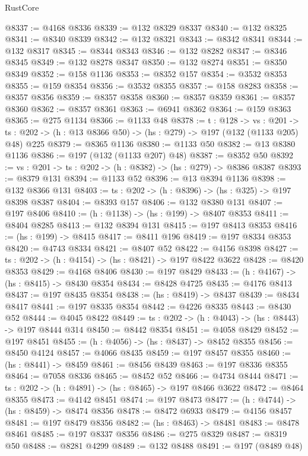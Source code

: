 \begin{lexlean}{RustCore}
\begin{coremodule}
@8337 := @4168 @8336
@8339 := @132 @8329 @8337
@8340 := @132 @8325
@8341 := @8340 @8339
@8342 := @132 @8321
@8343 := @8342 @8341
@8344 := @132 @8317
@8345 := @8344 @8343
@8346 := @132 @8282
@8347 := @8346 @8345
@8349 := @132 @8278 @8347
@8350 := @132 @8274
@8351 := @8350 @8349
@8352 := @158 @1136
@8353 := @8352 @157
@8354 := @3532 @8353
@8355 := @159 @8354
@8356 := @3532 @8355
@8357 := @158 @8283
@8358 := @8357 @8356
@8359 := @8357 @8358
@8360 := @8357 @8359
@8361 := @8357 @8360
@8362 := @8357 @8361
@8363 := @6941 @8362
@8364 := @159 @8363
@8365 := @275 @1134
@8366 := @1133 @48
@8378 := {t : @128} ->
  {vs : @201} ->
  {ts : @202} -> (h : @13 @8366 @50) -> (hs : @279) -> @197 (@132 (@1133 @205) @48) @225
@8379 := @8365 @1136
@8380 := @1133 @50
@8382 := @13 @8380 @1136
@8386 := @197 (@132 (@1133 @207) @48)
@8387 := @8352 @50
@8392 := {vs : @201} -> {ts : @202} -> (h : @8382) -> (hs : @279) -> @8386 @8387
@8393 := @8379 @131
@8394 := @1133 @52
@8396 := @13 @8394 @1136
@8398 := @132 @8366 @131
@8403 := {ts : @202} -> (h : @8396) -> (hs : @325) -> @197 @8398 @8387
@8404 := @8393 @157
@8406 := @132 @8380 @131
@8407 := @197 @8406
@8410 := (h : @1138) -> (hs : @199) -> @8407 @8353
@8411 := @8404 @8285
@8413 := @132 @8394 @131
@8415 := @197 @8413 @8353
@8416 := (hs : @199) -> @8415
@8417 := @8411 @196
@8419 := @197 @8334 @8353
@8420 := @4743 @8334
@8421 := @8407 @52
@8422 := @4156 @8398
@8427 := {ts : @202} -> (h : @4154) -> (hs : @8421) -> @197 @8422 @3622
@8428 := @8420 @8353
@8429 := @4168 @8406
@8430 := @197 @8429
@8433 := (h : @4167) -> (hs : @8415) -> @8430 @8354
@8434 := @8428 @4725
@8435 := @4176 @8413
@8437 := @197 @8435 @8354
@8438 := (hs : @8419) -> @8437
@8439 := @8434 @8417
@8441 := @197 @8335 @8354
@8442 := @4226 @8335
@8443 := @8430 @52
@8444 := @4045 @8422
@8449 := {ts : @202} -> (h : @4043) -> (hs : @8443) -> @197 @8444 @314
@8450 := @8442 @8354
@8451 := @4058 @8429
@8452 := @197 @8451
@8455 := (h : @4056) -> (hs : @8437) -> @8452 @8355
@8456 := @8450 @4124
@8457 := @4066 @8435
@8459 := @197 @8457 @8355
@8460 := (hs : @8441) -> @8459
@8461 := @8456 @8439
@8463 := @197 @8336 @8355
@8464 := @7058 @8336
@8465 := @8452 @52
@8466 := @4734 @8444
@8471 := {ts : @202} -> (h : @4891) -> (hs : @8465) -> @197 @8466 @3622
@8472 := @8464 @8355
@8473 := @4142 @8451
@8474 := @197 @8473
@8477 := (h : @4744) -> (hs : @8459) -> @8474 @8356
@8478 := @8472 @6933
@8479 := @4156 @8457
@8481 := @197 @8479 @8356
@8482 := (hs : @8463) -> @8481
@8483 := @8478 @8461
@8485 := @197 @8337 @8356
@8486 := @275 @8329
@8487 := @8319 @50
@8488 := @8281 @4299
@8489 := @132 @8488
@8491 := @197 (@8489 @48)

\end{coremodule}
\end{lexlean}
